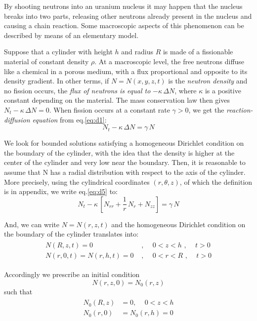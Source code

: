 \documentclass[../main.tex]{subfiles}
\begin{document}
By shooting neutrons into an uranium nucleus it may happen that the nucleus breaks into two parts, releasing other neutrons already present in the nucleus and causing a chain reaction. Some macroscopic aspects of this phenomenon can be described by means of an elementary model.

Suppose that a cylinder with height $h$ and radius $R$ is made of a fissionable material of constant density $\rho$. At a macroscopic level, the free neutrons diffuse like a chemical in a porous medium, with a flux proportional and opposite to its density gradient. In other terms, if $N = N (x, y, z,t)$ is the \textit{neutron density} and no fission occurs, the \textit{flux of neutrons is equal to} $− \kappa \, \Delta N$, where $\kappa$ is a positive constant depending on the material. The mass conservation law then gives $N_t - \kappa \, \Delta N = 0$. When fission occurs at a constant rate $\gamma > 0$, we get the \textit{reaction-diffusion equation} from eq.\ref{eq:d1}:
\begin{equation}
    N_t - \kappa \, \Delta N = \gamma \, N \label{eq:d5}
\end{equation}

We look for bounded solutions satisfying a homogeneous Dirichlet condition on the boundary of the cylinder, with the idea that the density is higher at the center of the cylinder and very low near the boundary. Then, it is reasonable to assume that N has a radial distribution with respect to the axis of the cylinder. More precisely, using the cylindrical coordinates $(r,\theta,z)$, of which the definition is in appendix, we write eq.\ref{eq:d5} to:
\begin{equation}
    N_t - \kappa \, [N_{rr} + \frac{1}{r} \, N_r + N_{zz}] = \gamma \, N \label{eq:d6}
\end{equation}

And, we can write $N = N(r,z,t)$ and the homogeneous Dirichlet condition on the boundary of the cylinder translates into:
\begin{align}
    \begin{split} \label{eq:d7}
        N(R, z, t) = 0 & \text{ ,  } \quad 0 < z < h \text{ ,  } \quad t > 0 \\
        N(r, 0, t) = N(r, h, t) = 0 & \text{ ,  } \quad 0 < r < R \text{ ,  } \quad t > 0 
    \end{split}
\end{align}

Accordingly we prescribe an initial condition
\begin{equation}
    N(r,z,0) = N_0(r ,z) \label{eq:d8}
\end{equation}
such that
\begin{align}
    \begin{split} \label{eq:d9}
        N_0(R, z) &= 0 \text{, } \quad 0 < z < h \\
        N_0(r, 0) &= N_0(r, h) = 0
    \end{split}
\end{align}
\end{document}
